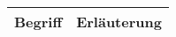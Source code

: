 

\begin{table}[ht]
    \begin{tabularx}{\textwidth}{l X}
        \toprule
        Begriff & Erläuterung \\
        \midrule
        \bottomrule
    \end{tabularx}
\end{table}
